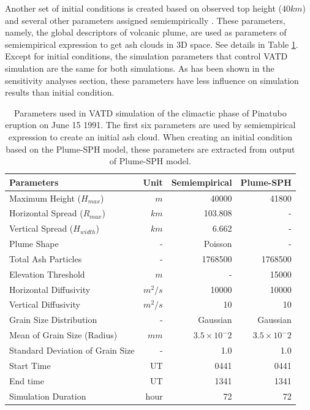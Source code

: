 \documentclass[draft,linenumbers]{agujournal2019}
\begin{document}
Another set of initial conditions is created based on observed top height ($40 km$) and several other parameters assigned semiempirically \citep{bursik2012estimation}. These parameters, namely, the global descriptors of volcanic plume, are used as parameters of semiempirical expression to get ash clouds in 3D space. See details in Table \ref{tab:input_parameter_Puff_simulation}. Except for initial conditions, the simulation parameters that control VATD simulation are the same for both simulations. As has been shown in the sensitivity analyses section, these parameters have less influence on simulation results than initial condition.
\begin{table}[htp]
\centering
\caption{Parameters used in VATD simulation of the climactic phase of Pinatubo eruption on June 15 1991. The first six parameters are used by semiempirical expression to create an initial ash cloud. When creating an initial condition based on the Plume-SPH model, these parameters are extracted from output of Plume-SPH model.}
	 \begin{tabular}{lrrr}
	 \hline
	 Parameters & Unit & Semiempirical & Plume-SPH \\
	 \hline
	 Maximum Height ($H_{max}$) & $m$ & 40000 & 41800 \\
	 Horizontal Spread ($R_{max}$) & $km$ & 103.808 & -\\
	 Vertical Spread ($H_{width}$) & $km$ & 6.662 & - \\
	 Plume Shape & - & Poisson & - \\
	 Total Ash Particles & - & 1768500 & 1768500 \\
	 Elevation Threshold & $m$ & - & 15000 \\
	 Horizontal Diffusivity & $m^2/s$ &10000 & 10000\\
	 Vertical Diffusivity & $m^2/s$ & 10 & 10 \\
	 Grain Size Distribution & - & Gaussian & Gaussian \\
	 Mean of Grain Size (Radius) & $mm$ & $3.5 \times 10 ^-2$ & $3.5 \times 10 ^-2$ \\
	 Standard Deviation of Grain Size & - & 1.0 & 1.0 \\
	 	Start Time & UT & 0441 & 0441 \\
	 End time & UT & 1341 & 1341 \\
	 Simulation Duration & hour & 72 & 72 \\
	 \hline
	 \end{tabular}
	 \label{tab:input_parameter_Puff_simulation}
\end{table}
\end{document}
